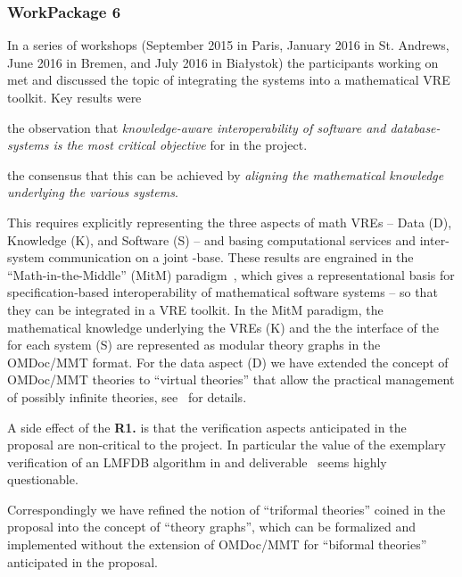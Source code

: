 \documentclass{deliverablereport}
\begin{document}
  \subsubsection{WorkPackage 6}
  In a series of workshops (September 2015 in Paris, January 2016 in St. Andrews, June
  2016 in Bremen, and July 2016 in Bia{\l}ystok) the participants working on
   met and discussed the topic of integrating the \pn systems into a
  mathematical VRE toolkit.  Key results were
  \begin{compactitem}[\bf R1.]
  \item the observation that \emph{knowledge-aware interoperability of software and
      database-systems is the most critical objective} for  in the \pn
    project.
  \item the consensus that this can be achieved by \emph{aligning the mathematical
      knowledge underlying the various systems}.
  \end{compactitem}
  This requires explicitly representing the three aspects of math VREs -- Data (D),
  Knowledge (K), and Software (S) -- and basing computational services and inter-system
  communication on a joint \DKS-base. These results are engrained in the
  ``Math-in-the-Middle'' (MitM) paradigm~\cite{DehKohKon:iop16}, which gives a
  representational basis for specification-based interoperability of mathematical software
  systems -- so that they can be integrated in a VRE toolkit. In the MitM paradigm, the
  mathematical knowledge underlying the VREs (K) and the the interface of the for each
  system (S) are represented as modular theory graphs in the OMDoc/MMT format. For the
  data aspect (D) we have extended the concept of OMDoc/MMT theories to ``virtual
  theories'' that allow the practical management of possibly infinite theories,
  see~\cite{ODK-D6.2} for details.

  A side effect of the \textbf{R1.} is that the verification aspects anticipated in the
  proposal are non-critical to the \pn project. In particular the value of the exemplary
  verification of an LMFDB algorithm in  and
  deliverable~ seems highly questionable.

  Correspondingly we have refined the notion of ``triformal theories'' coined in the
  proposal into the concept of ``\DKS theory graphs'', which can be formalized and
  implemented without the extension of OMDoc/MMT for ``biformal theories'' anticipated in
  the proposal.
\end{document}
